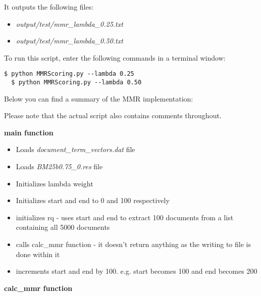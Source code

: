 \documentclass{article} %
\begin{document}
It outputs the following files:

\begin{itemize}
    \item \textit{output/test/mmr\_lambda\_0.25.txt}
    \item \textit{output/test/mmr\_lambda\_0.50.txt}
\end{itemize}

To run this script, enter the following commands in a terminal window:

\begin{lstlisting}[style=Bash]
  $ python MMRScoring.py --lambda 0.25
  $ python MMRScoring.py --lambda 0.50
\end{lstlisting}

Below you can find a summary of the MMR implementation:

Please note that the actual script also contains comments throughout.

\textbf{main function}

\begin{itemize}
    \item Loads \textit{document\_term\_vectors.dat} file
    \item Loads \textit{BM25b0.75\_0.res} file
    \item Initializes lambda weight
    \item Initializes start and end to 0 and 100 respectively
    \item initializes rq - uses start and end to extract 100 documents from a list containing all 5000 documents
    \item calls calc\_mmr function - it doesn't return anything as the writing to file is done within it
    \item increments start and end by 100. e.g. start becomes 100 and end becomes 200
\end{itemize}

\textbf{calc\_mmr function}
\end{document}
